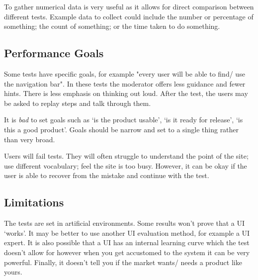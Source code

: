 To gather numerical data is very useful as it allows for direct comparison between different tests. Example data to collect could include the number or percentage of something; the count of something; or the time taken to do something. 

\subsection{Performance Goals}
Some tests have specific goals, for example "every user will be able to find/ use the navigation bar". In these tests the moderator offers less guidance and fewer hints. There is less emphasis on thinking out loud. After the test, the users may be asked to replay steps and talk through them.

It is \textit{bad} to set goals such as `is the product usable', `is it ready for release', `is this a good product'. Goals should be narrow and set to a single thing rather than very broad.

Users will fail tests. They will often struggle to understand the point of the site; use different vocabulary; feel the site is too busy. However, it can be okay if the user is able to recover from the mistake and continue with the test.

\subsection{Limitations}
The tests are set in artificial environments. Some results won't prove that a UI `works'. It may be better to use another UI evaluation method, for example a UI expert. It is also possible that a UI has an internal learning curve which the test doesn't allow for however when you get accustomed to the system it can be very powerful. Finally, it doesn't tell you if the market wants/ needs a product like  yours. 